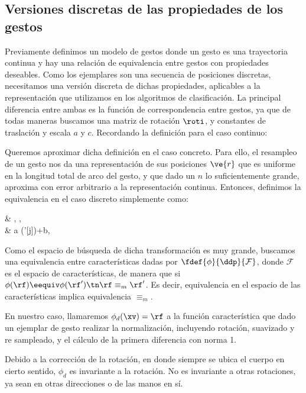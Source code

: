 \subsection{Versiones discretas de las propiedades de los gestos}

Previamente definimos un modelo de gestos donde un gesto es una trayectoria continua y hay una relación de equivalencia entre gestos con propiedades deseables. Como los ejemplares son una secuencia de posiciones discretas, necesitamos una versión discreta de dichas propiedades, aplicables a la representación que utilizamos en los algoritmos de clasificación. La principal diferencia entre ambas es la función de correspondencia entre gestos, ya que de todas maneras buscamos una matriz de rotación $\roti$, y constantes de traslación y escala $a$ y $c$. Recordando la definición para el caso continuo:



Queremos aproximar dicha definición en el caso concreto. Para ello, el resampleo de un gesto nos da una representación de sus posiciones $\ve{r}$ que es uniforme en la longitud total de arco del gesto, y que dado un $n$ lo suficientemente grande, aproxima con error arbitrario a la representación continua.  Entonces, definimos la equivalencia en el caso discreto simplemente como:

{& \existsroti,  \existsb,  \existsa \\ 
& \rf[j] \eequiv  a (\roti \rf'[j])+b, \;   }


Como el espacio de búsqueda de dicha transformación es muy grande, buscamos una equivalencia entre características dadas por $ \fdef{\phi}{\ddp}{\mathcal{F}}$, donde $\mathcal{F}$ es el espacio de características, de manera que si $ \phi(\rf) \eequiv \phi(\rf') \tn \rf \equiv_m \rf'$. Es decir, equivalencia en el espacio de las características implica  equivalencia $\equiv_m$.

En nuestro caso, llamaremos  $\phi_d(\xv)=\rf$ a la función característica que dado un ejemplar de gesto realizar la normalización, incluyendo rotación, suavizado y re sampleado, y el cálculo de la primera diferencia con norma 1. 

Debido a la corrección de la rotación, en donde siempre se ubica el cuerpo en cierto sentido, $\phi_d$ es invariante a la rotación. No es invariante a otras rotaciones, ya sean en otras direcciones o de las manos en sí.

